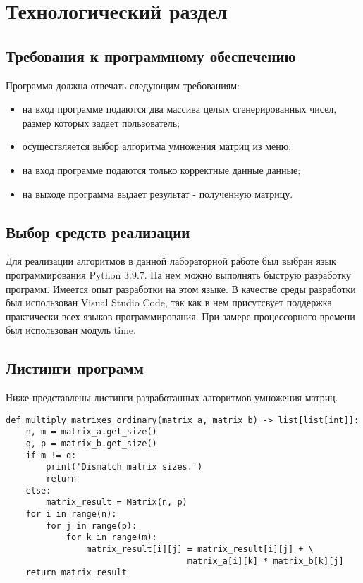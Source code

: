 \chapter{Технологический раздел}
\section{Требования к программному обеспечению}
Программа должна отвечать следующим требованиям:
\begin{itemize}
	\item на вход программе подаются два массива целых сгенерированных чисел, размер которых задает пользователь;
	\item осуществляется выбор алгоритма умножения матриц из меню;
	\item на вход программе подаются только корректные данные данные;
	\item на выходе программа выдает результат - полученную матрицу.
\end{itemize}

\section{Выбор средств реализации}
Для реализации алгоритмов в данной лабораторной работе был выбран язык программирования Python 3.9.7\cite{python3}. На нем можно выполнять быструю разработку программ. Имеется опыт разработки на этом языке. В качестве среды разработки был использован Visual Studio Code\cite{vs}, так как в нем присутсвует поддержка практически всех языков программирования. При замере процессорного времени был использован модуль time\cite{time}.

\section{Листинги программ}
Ниже представлены листинги разработанных алгоритмов умножения матриц.

\begin{lstlisting}[caption=Программный код умножения матриц стандартным способом]
def multiply_matrixes_ordinary(matrix_a, matrix_b) -> list[list[int]]:
	n, m = matrix_a.get_size()
	q, p = matrix_b.get_size()
	if m != q:
		print('Dismatch matrix sizes.')
		return
	else:
		matrix_result = Matrix(n, p)
	for i in range(n):
		for j in range(p):
			for k in range(m):
				matrix_result[i][j] = matrix_result[i][j] + \
									matrix_a[i][k] * matrix_b[k][j]
	return matrix_result
\end{lstlisting}

